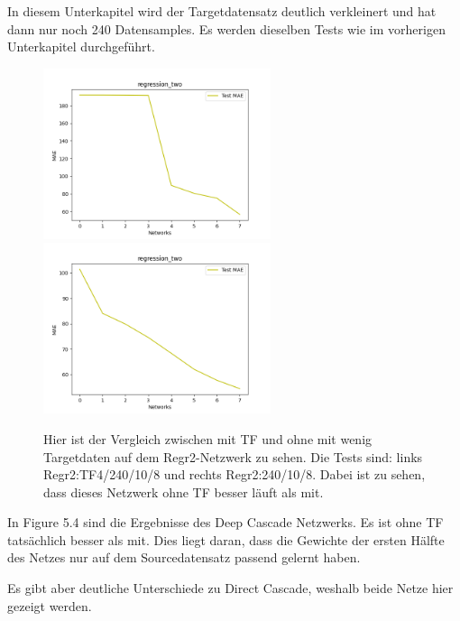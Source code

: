 In diesem Unterkapitel wird der Targetdatensatz deutlich verkleinert und hat dann nur noch 240 Datensamples. Es werden dieselben Tests wie 
im vorherigen Unterkapitel durchgeführt. 


\begin{figure}[htpb]
    \includegraphics[height=5cm]{../../Plots/ba_plots/regression_small/regr2_ts.png}
    \includegraphics[height=5cm]{../../Plots/ba_plots/regression_small/woregr2_ts.png}
    \caption{\label{fig:smallregr} 
    \small{Hier ist der Vergleich zwischen mit TF und ohne mit wenig Targetdaten auf dem Regr2-Netzwerk zu sehen. 
    Die Tests sind: links Regr2:TF4/240/10/8 und rechts Regr2:240/10/8. Dabei ist zu sehen, dass dieses Netzwerk ohne TF besser läuft als mit.}}
\end{figure}


In Figure 5.4 sind die Ergebnisse des Deep Cascade Netzwerks. Es ist ohne TF tatsächlich besser als mit. Dies liegt daran, dass die Gewichte der 
ersten Hälfte des Netzes nur auf dem Sourcedatensatz passend gelernt haben. 

Es gibt aber deutliche Unterschiede zu Direct Cascade, weshalb beide Netze hier gezeigt werden. 

